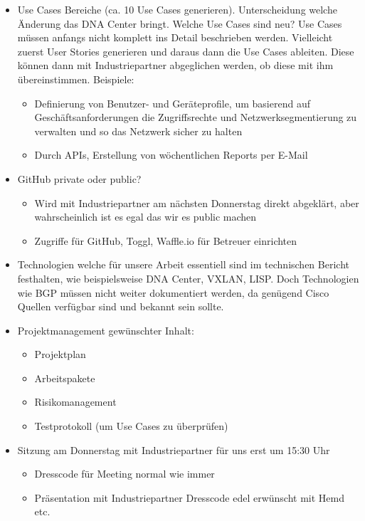 \begin{itemize}	
	\item Use Cases Bereiche (ca. 10 Use Cases generieren). Unterscheidung welche Änderung das DNA Center bringt. Welche Use Cases sind neu? Use Cases müssen anfangs nicht komplett ins Detail beschrieben werden. Vielleicht zuerst User Stories generieren und daraus dann die Use Cases ableiten. Diese können dann mit Industriepartner abgeglichen werden, ob diese mit ihm übereinstimmen. Beispiele:
	\begin{itemize}
		\item Definierung von Benutzer- und Geräteprofile, um basierend auf Geschäftsanforderungen die Zugriffsrechte und Netzwerksegmentierung zu verwalten und so das Netzwerk sicher zu halten
		\item Durch APIs, Erstellung von wöchentlichen Reports per E-Mail
	\end{itemize}
	\item GitHub private oder public?
	\begin{itemize}
		\item Wird mit Industriepartner am nächsten Donnerstag direkt abgeklärt, aber wahrscheinlich ist es egal das wir es public machen
		\item Zugriffe für GitHub, Toggl, Waffle.io für Betreuer einrichten
	\end{itemize} 
	\item Technologien welche für unsere Arbeit essentiell sind im technischen Bericht festhalten, wie beispielsweise DNA Center, VXLAN, LISP. Doch Technologien wie BGP müssen nicht weiter dokumentiert werden, da genügend Cisco Quellen verfügbar sind und bekannt sein sollte.
	\item Projektmanagement gewünschter Inhalt:
	\begin{itemize}
		\item Projektplan
		\item Arbeitspakete
		\item Risikomanagement
		\item Testprotokoll (um Use Cases zu überprüfen)
	\end{itemize}
	\item Sitzung am Donnerstag mit Industriepartner für uns erst um 15:30 Uhr
	\begin{itemize}
		\item Dresscode für Meeting normal wie immer
		\item Präsentation mit Industriepartner Dresscode edel erwünscht mit Hemd etc.
	\end{itemize}

\end{itemize}
